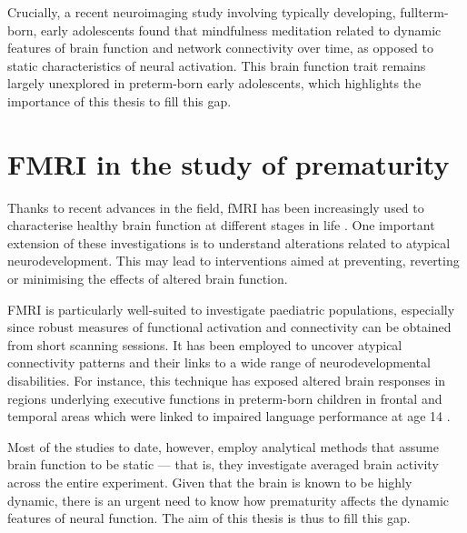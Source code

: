 Crucially, a recent neuroimaging study involving typically developing, fullterm-born, early adolescents found that mindfulness meditation related to dynamic features of brain function and network connectivity over time, as opposed to static characteristics of neural activation\citep{Marusak2018}. This brain function trait remains largely unexplored in preterm-born early adolescents, which highlights the importance of this thesis to fill this gap.




\section{FMRI in the study of prematurity}
\label{sub:fMRI_in_preterm}


Thanks to recent advances in the field, fMRI has been increasingly used to characterise healthy brain function at different stages in life \citep{Power2010}. 
One important extension of these investigations is to understand alterations related to atypical neurodevelopment. 
This may lead to interventions aimed at preventing, reverting or minimising the effects of altered brain function.


FMRI is particularly well-suited to investigate paediatric populations, especially since robust measures of functional activation and connectivity can be obtained from short scanning sessions. It has been employed to uncover atypical connectivity patterns and their links to a wide range of neurodevelopmental disabilities. For instance, this technique has exposed altered brain responses in regions underlying executive functions in preterm-born children in frontal \citep{Reveillon2013,Murner-Lavanchy2014} and temporal areas \citep{Kwon2014a, Wilke2014} which were linked to impaired language performance at age 14 \citep{Wilke2014}.

Most of the studies to date, however, employ analytical methods that assume brain function to be static --- that is, they investigate averaged brain activity across the entire experiment. Given that the brain is known to be highly dynamic, there is an urgent need to know how prematurity affects the dynamic features of neural function. The aim of this thesis is thus to fill this gap.



